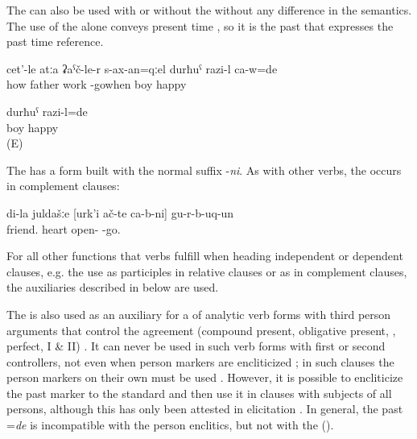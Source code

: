 The   can also be used with  or without the   without any difference in the semantics. The use of the  alone conveys present time , so it is the past  that expresses the past time reference. 

\begin{exe}
	\ex	\label{ex:‎When the father came back from work, the boy was happy}
	\gll	cet'-le	atːa	ʡaˁč-le-r	s-ax-an=qːel	durħuˁ	razi-l	ca-w=de\\
		how	father	work	-gowhen	boy	happy	\\
	\glt	{}

	\ex	\label{ex:The boy was happy.COP}
	\gll	durħuˁ	razi-l=de\\
		boy	happy\\
	\glt	{} (E)
\end{exe}

The  has a  form built with the normal  suffix -\textit{ni}. As with other verbs, the  occurs in complement clauses:

\begin{exe}
	\ex	\label{ex:My friends turned out to be open-hearted.}
	\gll	di-la		juldašːe		[urk'i	ač-te		ca-b-ni]			gu-r-b-uq-un\\
			friend.	heart	open- 		-go.\\
	\glt	{}
\end{exe}



For all other functions that verbs fulfill when heading independent or dependent clauses, e.g. the use as participles in relative clauses or as  in complement clauses, the auxiliaries described in  below are used. 

The  is also used as an auxiliary for a  of analytic verb forms with third person arguments that control the agreement (compound present, obligative present, , perfect,  I \& II) . It can never be used in such verb forms with first or second  controllers, not even when person markers are encliticized ; in such clauses the person markers on their own must be used . However, it is possible to encliticize the past marker  to the standard  and then use it in clauses with subjects of all persons, although this has only been attested in elicitation . In general, the past  =\textit{de} is incompatible with the person enclitics, but not with the  ().

